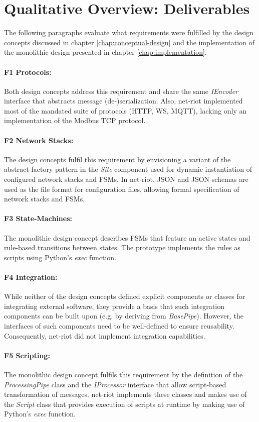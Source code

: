 \section{Qualitative Overview: Deliverables}
\label{sec:pm-deliverables}
The following paragraphs evaluate what requirements were fulfilled by the design concepts discussed in chapter \ref{chap:conceptual-design} and the implementation of the monolithic design presented in chapter \ref{chap:implementation}.

\paragraph{F1 Protocols:} Both design concepts address this requirement and share the same \emph{IEncoder} interface that abstracts message (de-)serialization. Also, net-riot implemented most of the mandated suite of protocols (\ac{HTTP}, \ac{WS}, \ac{MQTT}), lacking only an implementation of the Modbus \ac{TCP} protocol.
\paragraph{F2 Network Stacks:} The design concepts fulfil this requirement by envisioning a variant of the abstract factory pattern in the \emph{Site} component used for dynamic instantiation of configured network stacks and \acp{FSM}. In net-riot, \ac{JSON} and \ac{JSON} schemas are used as the file format for configuration files, allowing formal specification of network stacks and \acp{FSM}.
\paragraph{F3 State-Machines:} The monolithic design concept describes \acp{FSM} that feature an active states and rule-based transitions between states. The prototype implements the rules as scripts using Python's \emph{exec} function.
\paragraph{F4 Integration:} While neither of the design concepts defined explicit components or classes for integrating external software, they provide a basis that such integration components can be built upon (e.g. by deriving from \emph{BasePipe}). However, the interfaces of such components need to be well-defined to ensure reusability. Consequently, net-riot did not implement integration capabilities.
\paragraph{F5 Scripting:} The monolithic design concept fulfils this requirement by the definition of the \emph{ProcessingPipe} class and the \emph{IProcessor} interface that allow script-based transformation of messages. net-riot implements these classes and makes use of the \emph{Script} class that provides execution of scripts at runtime by making use of Python's \emph{exec} function.
